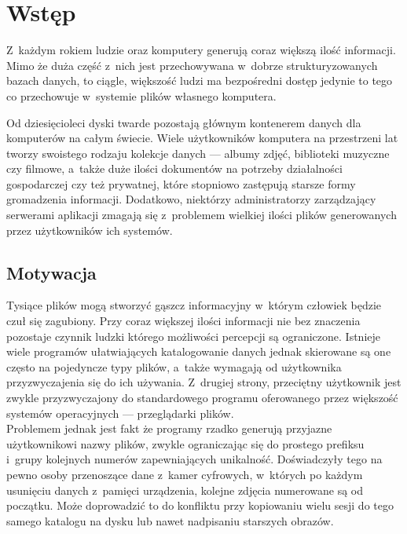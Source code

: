 \chapter{Wstęp}
\label{wstep}

\par
 Z~każdym rokiem ludzie oraz komputery generują coraz większą ilość informacji.
Mimo że duża część z~nich jest przechowywana w~dobrze strukturyzowanych bazach danych, to ciągle, większość ludzi ma bezpośredni dostęp jedynie to tego co przechowuje w~systemie plików własnego komputera.
\par
Od dziesięcioleci dyski twarde pozostają głównym kontenerem danych dla komputerów na całym świecie.
Wiele użytkowników komputera na przestrzeni lat tworzy swoistego rodzaju kolekcje danych --- albumy zdjęć, biblioteki muzyczne czy filmowe, a~także duże ilości dokumentów na potrzeby działalności gospodarczej czy też prywatnej, które stopniowo zastępują starsze formy gromadzenia informacji. Dodatkowo, niektórzy administratorzy zarządzający serwerami aplikacji zmagają się z~problemem wielkiej ilości plików generowanych przez użytkowników ich systemów.

\section{Motywacja}
\label{motywacja}
\par
Tysiące plików mogą stworzyć gąszcz informacyjny w~którym człowiek będzie czuł się zagubiony. Przy coraz większej ilości informacji nie bez znaczenia pozostaje czynnik ludzki którego możliwości percepcji są ograniczone.
Istnieje wiele programów ułatwiających katalogowanie danych jednak skierowane są one często na pojedyncze typy plików, a~także wymagają od użytkownika przyzwyczajenia się do ich używania. Z~drugiej strony, przeciętny użytkownik jest zwykle przyzwyczajony do standardowego programu oferowanego przez większość systemów operacyjnych --- przeglądarki plików.\\

Problemem jednak jest fakt że programy rzadko generują przyjazne użytkownikowi nazwy plików, zwykle ograniczając się do prostego prefiksu i~grupy kolejnych numerów zapewniających unikalność.
Doświadczyły tego na pewno osoby przenoszące dane z~kamer cyfrowych, w~których po każdym usunięciu danych z~pamięci urządzenia, kolejne zdjęcia numerowane są od początku. Może doprowadzić to do konfliktu przy kopiowaniu wielu sesji do tego samego katalogu na dysku lub nawet nadpisaniu starszych obrazów.


